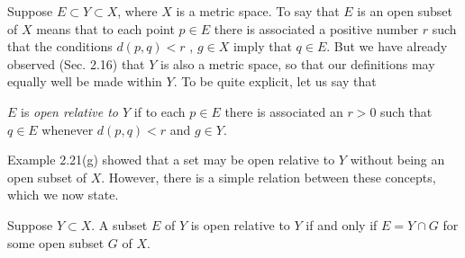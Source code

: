 \begin{myRemark}
    Suppose $E \subset Y \subset X$, where $X$ is a metric space. To say that $E$ is an open subset of $X$ means that to each point $p \in E$ there is associated a positive number $r$ such that the conditions $d(p,q) < r$ , $g \in X$ imply that $q \in E$. But we have already observed (Sec. 2.16) that $Y$ is also a metric space, so that our definitions may equally well be made within $Y$. To be quite explicit, let us say that 
    
    $E$ is \emph{open relative to $Y$} if to each $p \in E$ there is associated an $r > 0$ such that $q \in E$ whenever $d(p,q) <r$ and $g \in Y$. 
    
    Example 2.21(g) showed that a set may be open relative to $Y$ without being an open subset of $X$. However, there is a simple relation between these concepts, which we now state.
\end{myRemark}

\begin{thm}
    \label{thm:2.30}
    Suppose $Y \subset X$. A subset $E$ of $Y$ is open relative to $Y$ if and only if $E = Y \cap G$ for some open subset $G$ of $X$.
\end{thm}
